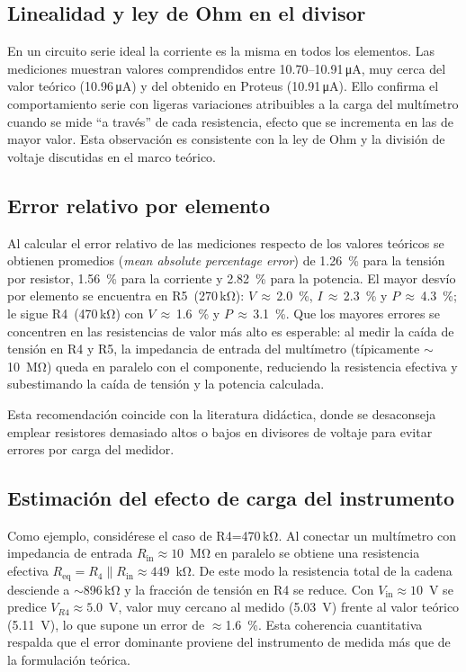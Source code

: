 \documentclass[conference]{IEEEtran}
\begin{document}
\subsection{Linealidad y ley de Ohm en el divisor}
En un circuito serie ideal la corriente es la misma en todos los elementos.  Las mediciones muestran valores comprendidos entre \mbox{10.70--10.91\,\si{\micro A}}, muy cerca del valor teórico (\mbox{10.96\,\si{\micro A}}) y del obtenido en Proteus (\mbox{10.91\,\si{\micro A}}).  Ello confirma el comportamiento serie con ligeras variaciones atribuibles a la carga del multímetro cuando se mide “a través” de cada resistencia, efecto que se incrementa en las de mayor valor.  Esta observación es consistente con la ley de Ohm y la división de voltaje discutidas en el marco teórico\cite{ref:khan}.

\subsection{Error relativo por elemento}
Al calcular el error relativo de las mediciones respecto de los valores teóricos se obtienen promedios (\emph{mean absolute percentage error}) de 1.26~\% para la tensión por resistor, 1.56~\% para la corriente y 2.82~\% para la potencia.  El mayor desvío por elemento se encuentra en \mbox{R5 (270\,k\si{\ohm})}: \mbox{$V$\,$\approx$\,2.0~\%}, \mbox{$I$\,$\approx$\,2.3~\%} y \mbox{$P$\,$\approx$\,4.3~\%}; le sigue \mbox{R4 (470\,k\si{\ohm})} con \mbox{$V$\,$\approx$\,1.6~\%} y \mbox{$P$\,$\approx$\,3.1~\%}.  Que los mayores errores se concentren en las resistencias de valor más alto es esperable: al medir la caída de tensión en R4 y R5, la impedancia de entrada del multímetro (típicamente \mbox{$\sim$10~M\si{\ohm}}) queda en paralelo con el componente, reduciendo la resistencia efectiva y subestimando la caída de tensión y la potencia calculada\cite{ref:guia}.

Esta recomendación coincide con la literatura didáctica, donde se desaconseja emplear resistores demasiado altos o bajos en divisores de voltaje para evitar errores por carga del medidor\cite{ref:aac_measurement}.

\subsection{Estimación del efecto de carga del instrumento}
Como ejemplo, considérese el caso de \mbox{R4=470\,k\si{\ohm}}.  Al conectar un multímetro con impedancia de entrada \mbox{$R_{\mathrm{in}}\!\approx 10$~M\si{\ohm}} en paralelo se obtiene una resistencia efectiva \mbox{$R_{\mathrm{eq}}=R_4\parallel R_{\mathrm{in}}\approx 449$~k\si{\ohm}}.  De este modo la resistencia total de la cadena desciende a \mbox{$\sim$896\,k\si{\ohm}} y la fracción de tensión en R4 se reduce.  Con \mbox{$V_{\mathrm{in}}\approx 10$~V} se predice \mbox{$V_{R4}\approx 5.0$~V}, valor muy cercano al medido (5.03~V) frente al  valor teórico (5.11~V), lo que supone un error de \mbox{$\approx$1.6~\%}.  Esta coherencia cuantitativa respalda que el error dominante proviene del instrumento de medida más que de la formulación teórica.
\end{document}
